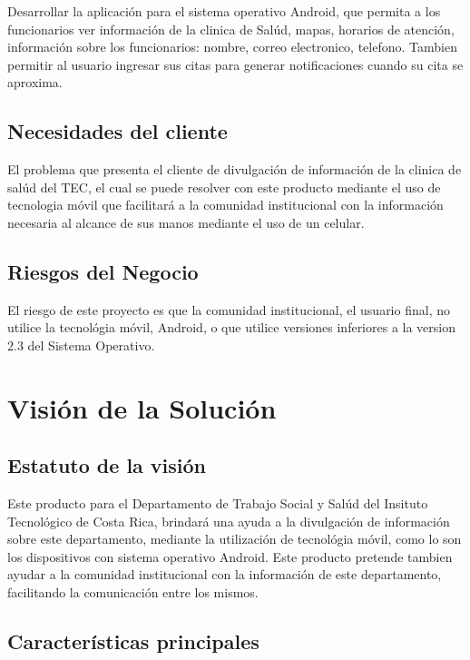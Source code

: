 \documentclass[12pt]{article}
\begin{document}
Desarrollar la aplicaci\'on para el sistema operativo Android, que permita a los funcionarios ver informaci\'on de la clinica de Sal\'ud, mapas, horarios de atenci\'on, informaci\'on sobre los funcionarios: nombre, correo electronico, telefono. Tambien permitir al usuario ingresar sus citas para generar notificaciones cuando su cita se aproxima.

\subsection{Necesidades del cliente}

El problema que presenta el cliente de divulgaci\'on de informaci\'on de la clinica de sal\'ud del TEC, el cual se puede resolver con este producto mediante el uso de tecnologia m\'ovil que facilitar\'a a la comunidad institucional con la informaci\'on necesaria al alcance de sus manos mediante el uso de un celular.

\subsection{Riesgos del Negocio}

El riesgo de este proyecto es que la comunidad institucional, el usuario final, no utilice la tecnol\'ogia m\'ovil, Android, o que utilice versiones inferiores a la version 2.3 del Sistema Operativo.

\newpage
\section{Visi\'on de la Soluci\'on}

\subsection{Estatuto de la visi\'on}

Este producto para el Departamento de Trabajo Social y Sal\'ud del Insituto Tecnol\'ogico de Costa Rica, brindar\'a una ayuda a la divulgaci\'on de informaci\'on sobre este departamento, mediante la utilizaci\'on de tecnol\'ogia m\'ovil, como lo son los dispositivos con sistema operativo Android. Este producto pretende tambien ayudar a la comunidad institucional con la informaci\'on de este departamento, facilitando la comunicaci\'on entre los mismos.

\subsection{Características principales}
\end{document}

